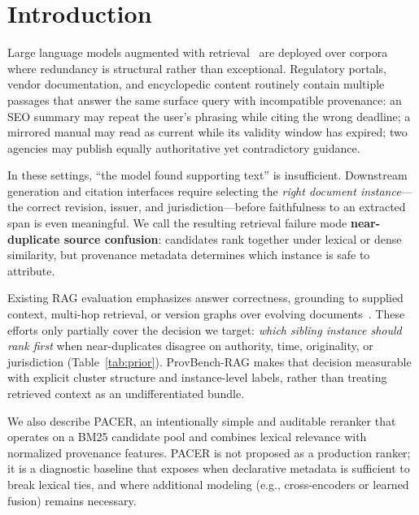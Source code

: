 \documentclass[sigconf,anonymous,review]{acmart}
\begin{document}
\section{Introduction}
\label{sec:intro}

Large language models augmented with retrieval~\cite{lewis2020retrieval,gao2024rag_survey} are deployed over corpora where redundancy is structural rather than exceptional.
Regulatory portals, vendor documentation, and encyclopedic content routinely contain multiple passages that answer the same surface query with incompatible provenance: an SEO summary may repeat the user's phrasing while citing the wrong deadline; a mirrored manual may read as current while its validity window has expired; two agencies may publish equally authoritative yet contradictory guidance.

In these settings, ``the model found supporting text'' is insufficient.
Downstream generation and citation interfaces require selecting the \emph{right document instance}---the correct revision, issuer, and jurisdiction---before faithfulness to an extracted span is even meaningful.
We call the resulting retrieval failure mode \textbf{near-duplicate source confusion}: candidates rank together under lexical or dense similarity, but provenance metadata determines which instance is safe to attribute.

Existing RAG evaluation emphasizes answer correctness, grounding to supplied context, multi-hop retrieval, or version graphs over evolving documents~\cite{jacovi2025facts,krishna2024frames,huwiler2025versionrag}.
These efforts only partially cover the decision we target: \emph{which sibling instance should rank first} when near-duplicates disagree on authority, time, originality, or jurisdiction (Table~\ref{tab:prior}).
ProvBench-RAG makes that decision measurable with explicit cluster structure and instance-level labels, rather than treating retrieved context as an undifferentiated bundle.

We also describe PACER, an intentionally simple and auditable reranker that operates on a BM25 candidate pool and combines lexical relevance with normalized provenance features.
PACER is not proposed as a production ranker; it is a diagnostic baseline that exposes when declarative metadata is sufficient to break lexical ties, and where additional modeling (e.g., cross-encoders or learned fusion) remains necessary.
\end{document}
